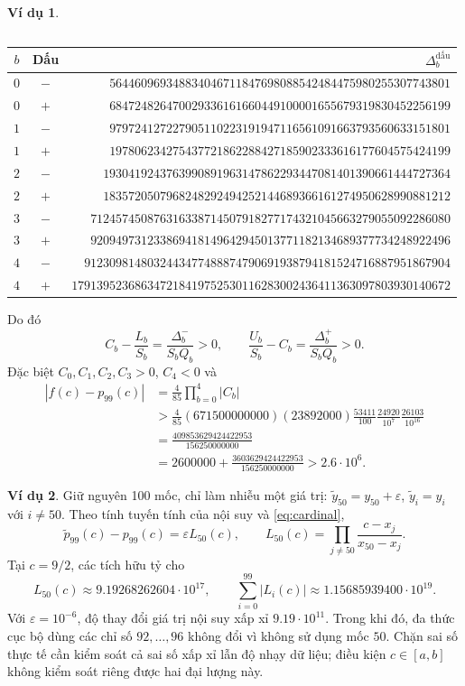 \documentclass[12pt,a4paper,oneside]{book}
\numberwithin{algorithm}{chapter}
\theoremstyle{definition}
\newtheorem{vidu}{Ví dụ}[chapter]
\begin{document}
\begin{vidu}
\begin{center}
\begin{tabular}{c|rrr}
\end{tabular}
\end{center}
\begin{center}
\scriptsize
\begin{tabular}{cc|r}\toprule
$b$&Dấu&$\Delta_b^{\text{dấu}}$\\\midrule
$0$&$-$&$564460969348834046711847698088542484475980255307743801$\\
$0$&$+$&$684724826470029336161660449100001655679319830452256199$\\
$1$&$-$&$979724127227905110223191947116561091663793560633151801$\\
$1$&$+$&$197806234275437721862288427185902333616177604575424199$\\
$2$&$-$&$1930419243763990891963147862293447081401390661444727364$\\
$2$&$+$&$1835720507968248292494252144689366161274950628990881212$\\
$3$&$-$&$712457450876316338714507918277174321045663279055092286080$\\
$3$&$+$&$920949731233869418149642945013771182134689377734248922496$\\
$4$&$-$&$9123098148032443477488874790691938794181524716887951867904$\\
$4$&$+$&$179139523686347218419752530116283002436411363097803930140672$\\\bottomrule
\end{tabular}
\end{center}
Do đó
\[
 C_b-\frac{L_b}{S_b}=\frac{\Delta_b^-}{S_bQ_b}>0,
 \qquad
 \frac{U_b}{S_b}-C_b=\frac{\Delta_b^+}{S_bQ_b}>0.
\]
Đặc biệt $C_0,C_1,C_2,C_3>0$, $C_4<0$ và
\begin{align*}
 |f(c)-p_{99}(c)|
 &=\frac4{85}\prod_{b=0}^{4}|C_b|\\
 &>\frac4{85}(671500000000)(23892000)
    \frac{53411}{100}\frac{24920}{10^7}\frac{26103}{10^{16}}\\
 &=\frac{409853629424422953}{156250000000}\\
 &=2600000+\frac{3603629424422953}{156250000000}
 >2.6\cdot10^6.
\end{align*}
\end{vidu}

\begin{vidu}
Giữ nguyên 100 mốc, chỉ làm nhiễu một giá trị: $\widetilde y_{50}=y_{50}+\varepsilon$, $\widetilde y_i=y_i$ với $i\ne50$. Theo tính tuyến tính của nội suy và \eqref{eq:cardinal},
\[
 \widetilde p_{99}(c)-p_{99}(c)=\varepsilon L_{50}(c),\qquad
 L_{50}(c)=\prod_{j\ne50}\frac{c-x_j}{x_{50}-x_j}.
\]
Tại $c=9/2$, các tích hữu tỷ cho
\[
 L_{50}(c)\approx9.19268262604\cdot10^{17},\qquad
 \sum_{i=0}^{99}|L_i(c)|\approx1.15685939400\cdot10^{19}.
\]
Với $\varepsilon=10^{-6}$, độ thay đổi giá trị nội suy xấp xỉ $9.19\cdot10^{11}$. Trong khi đó, đa thức cục bộ dùng các chỉ số $92,\ldots,96$ không đổi vì không sử dụng mốc $50$. Chặn sai số thực tế cần kiểm soát cả sai số xấp xỉ lẫn độ nhạy dữ liệu; điều kiện $c\in[a,b]$ không kiểm soát riêng được hai đại lượng này.
\end{vidu}
\end{document}
